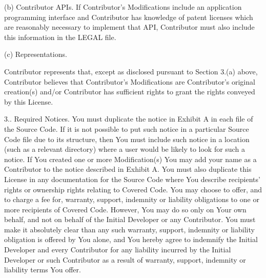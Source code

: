 \begin{DoxyEnumerate}
(b) Contributor A\-P\-Is. If Contributor's Modifications include an application programming interface and Contributor has knowledge of patent licenses which are reasonably necessary to implement that A\-P\-I, Contributor must also include this information in the L\-E\-G\-A\-L file. \begin{DoxyVerb} (c)    Representations.
\end{DoxyVerb}
 Contributor represents that, except as disclosed pursuant to Section 3.(a) above, Contributor believes that Contributor's Modifications are Contributor's original creation(s) and/or Contributor has sufficient rights to grant the rights conveyed by this License.

3.. Required Notices. You must duplicate the notice in Exhibit A in each file of the Source Code. If it is not possible to put such notice in a particular Source Code file due to its structure, then You must include such notice in a location (such as a relevant directory) where a user would be likely to look for such a notice. If You created one or more Modification(s) You may add your name as a Contributor to the notice described in Exhibit A. You must also duplicate this License in any documentation for the Source Code where You describe recipients' rights or ownership rights relating to Covered Code. You may choose to offer, and to charge a fee for, warranty, support, indemnity or liability obligations to one or more recipients of Covered Code. However, You may do so only on Your own behalf, and not on behalf of the Initial Developer or any Contributor. You must make it absolutely clear than any such warranty, support, indemnity or liability obligation is offered by You alone, and You hereby agree to indemnify the Initial Developer and every Contributor for any liability incurred by the Initial Developer or such Contributor as a result of warranty, support, indemnity or liability terms You offer.


\end{DoxyEnumerate}
